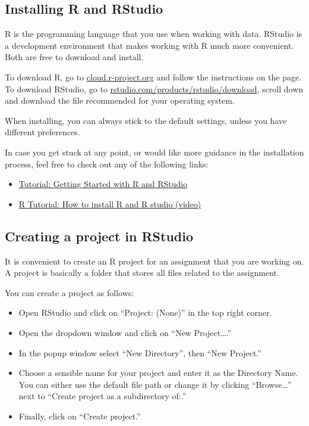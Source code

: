 \documentclass[
]{article}
\providecommand{\tightlist}{%
  \setlength{\itemsep}{0pt}\setlength{\parskip}{0pt}}
\begin{document}
\hypertarget{installing-r-and-rstudio}{%
\subsection{Installing R and RStudio}\label{installing-r-and-rstudio}}

R is the programming language that you use when working with data.
RStudio is a development environment that makes working with R much more
convenient. Both are free to download and install.

To download R, go to
\href{https://cloud.r-project.org/}{cloud.r-project.org} and follow the
instructions on the page. To download RStudio, go to
\href{https://www.rstudio.com/products/rstudio/download/}{rstudio.com/products/rstudio/download},
scroll down and download the file recommended for your operating system.

When installing, you can always stick to the default settings, unless
you have different preferences.

In case you get stuck at any point, or would like more guidance in the
installation process, feel free to check out any of the following links:

\begin{itemize}
\tightlist
\item
  \href{https://www.dataquest.io/blog/tutorial-getting-started-with-r-and-rstudio/}{Tutorial:
  Getting Started with R and RStudio}
\item
  \href{https://www.youtube.com/watch?v=0Qu7Jg1Jw5A}{R Tutorial: How to
  install R and R studio (video)}
\end{itemize}

\hypertarget{creating-a-project-in-rstudio}{%
\subsection{Creating a project in
RStudio}\label{creating-a-project-in-rstudio}}

It is convenient to create an R project for an assignment that you are
working on. A project is basically a folder that stores all files
related to the assignment.

You can create a project as follows:

\begin{itemize}
\tightlist
\item
  Open RStudio and click on ``Project: (None)'' in the top right corner.
\item
  Open the dropdown window and click on ``New Project\ldots.''
\item
  In the popup window select ``New Directory'', then ``New Project.''
\item
  Choose a sensible name for your project and enter it as the Directory
  Name. You can either use the default file path or change it by
  clicking ``Browse\ldots{}'' next to ``Create project as a subdirectory
  of:.''
\item
  Finally, click on ``Create project.''
\end{itemize}
\end{document}
